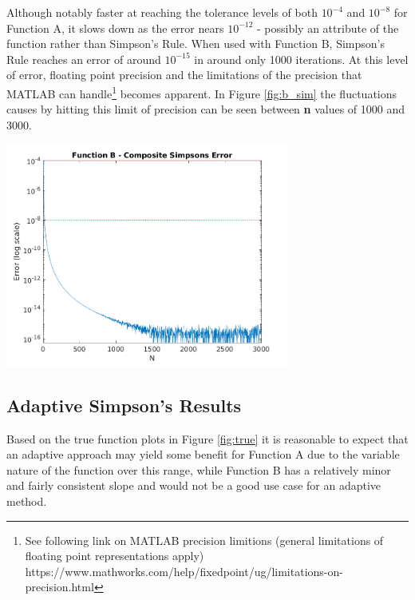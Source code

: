 \documentclass{article}
\begin{document}
Although notably faster at reaching the tolerance levels of both $10^{-4}$ and $10^{-8}$ for Function A, it slows down as the error nears $10^{-12}$ - possibly an attribute of the function rather than Simpson's Rule. When used with Function B, Simpson's Rule reaches an error of around $10^{-15}$ in around only 1000 iterations. At this level of error, floating point precision and the limitations of the precision that MATLAB can handle\footnote{See following link on MATLAB precision limitions (general limitations of floating point representations apply) https://www.mathworks.com/help/fixedpoint/ug/limitations-on-precision.html} becomes apparent. In Figure \ref{fig:b_sim} the fluctuations causes by hitting this limit of precision can be seen between \textbf{n} values of 1000 and 3000. 
 
\begin{center}
	\includegraphics[width=0.7\textwidth]{../output/b_simpsons.png}
	\label{fig:b_sim}
\end{center}



\subsection{Adaptive Simpson's Results}\label{results:adaptive}

Based on the true function plots in Figure \ref{fig:true} it is reasonable to expect that an adaptive approach may yield some benefit for Function A due to the variable nature of the function over this range, while Function B has a relatively minor and fairly consistent slope and would not be a good use case for an adaptive method.
\end{document}
